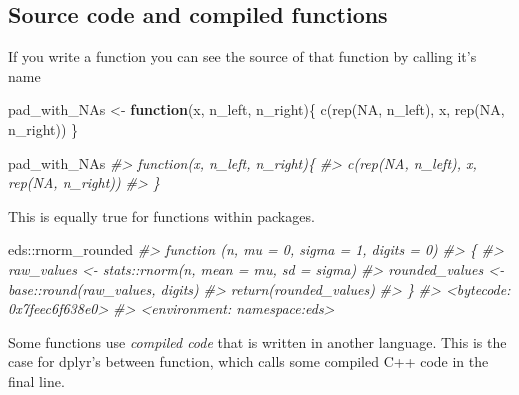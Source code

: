 \documentclass[
  12pt,
]{book}
\newenvironment{Shaded}{\begin{snugshade}}{\end{snugshade}}
\newcommand{\CommentTok}[1]{\textcolor[rgb]{0.56,0.35,0.01}{\textit{#1}}}
\newcommand{\ConstantTok}[1]{\textcolor[rgb]{0.00,0.00,0.00}{#1}}
\newcommand{\ControlFlowTok}[1]{\textcolor[rgb]{0.13,0.29,0.53}{\textbf{#1}}}
\newcommand{\FunctionTok}[1]{\textcolor[rgb]{0.00,0.00,0.00}{#1}}
\newcommand{\NormalTok}[1]{#1}
\newcommand{\OtherTok}[1]{\textcolor[rgb]{0.56,0.35,0.01}{#1}}
\newcommand{\SpecialCharTok}[1]{\textcolor[rgb]{0.00,0.00,0.00}{#1}}
\begin{document}
\hypertarget{source-code-and-compiled-functions}{%
\subsection{Source code and compiled functions}\label{source-code-and-compiled-functions}}

If you write a function you can see the source of that function by calling it's name

\begin{Shaded}
\begin{Highlighting}[]
\NormalTok{pad\_with\_NAs }\OtherTok{\textless{}{-}} \ControlFlowTok{function}\NormalTok{(x, n\_left, n\_right)\{}
  \FunctionTok{c}\NormalTok{(}\FunctionTok{rep}\NormalTok{(}\ConstantTok{NA}\NormalTok{, n\_left), x, }\FunctionTok{rep}\NormalTok{(}\ConstantTok{NA}\NormalTok{, n\_right))}
\NormalTok{\}}
\end{Highlighting}
\end{Shaded}

\begin{Shaded}
\begin{Highlighting}[]
\NormalTok{pad\_with\_NAs}
\CommentTok{\#\textgreater{} function(x, n\_left, n\_right)\{}
\CommentTok{\#\textgreater{}   c(rep(NA, n\_left), x, rep(NA, n\_right))}
\CommentTok{\#\textgreater{} \}}
\end{Highlighting}
\end{Shaded}

This is equally true for functions within packages.

\begin{Shaded}
\begin{Highlighting}[]
\NormalTok{eds}\SpecialCharTok{::}\NormalTok{rnorm\_rounded}
\CommentTok{\#\textgreater{} function (n, mu = 0, sigma = 1, digits = 0) }
\CommentTok{\#\textgreater{} \{}
\CommentTok{\#\textgreater{}     raw\_values \textless{}{-} stats::rnorm(n, mean = mu, sd = sigma)}
\CommentTok{\#\textgreater{}     rounded\_values \textless{}{-} base::round(raw\_values, digits)}
\CommentTok{\#\textgreater{}     return(rounded\_values)}
\CommentTok{\#\textgreater{} \}}
\CommentTok{\#\textgreater{} \textless{}bytecode: 0x7feec6f638e0\textgreater{}}
\CommentTok{\#\textgreater{} \textless{}environment: namespace:eds\textgreater{}}
\end{Highlighting}
\end{Shaded}

Some functions use \emph{compiled code} that is written in another language. This is the case for dplyr's between function, which calls some compiled C++ code in the final line.
\end{document}
